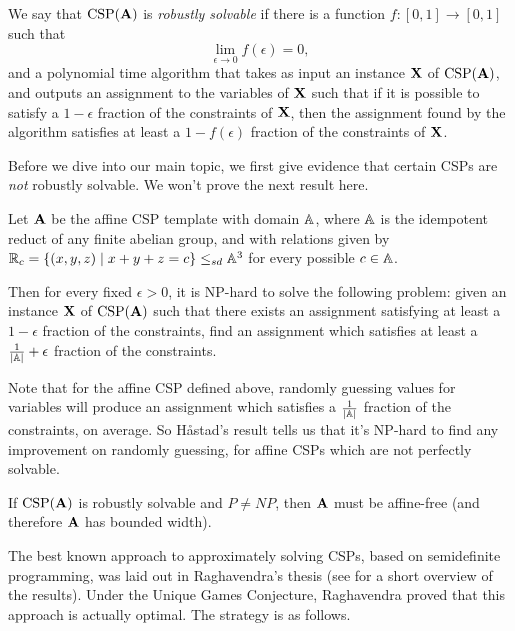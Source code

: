 \documentclass[letterpaper,11pt]{article}
\DeclareMathOperator{\CSP}{CSP}
\begin{document}
\begin{defn} We say that $\CSP(\fA)$ is \emph{robustly solvable} if there is a function $f : [0,1] \rightarrow [0,1]$ such that
\[
\lim_{\epsilon \rightarrow 0} f(\epsilon) = 0,
\]
and a polynomial time algorithm that takes as input an instance $\mathbf{X}$ of $\CSP(\fA)$, and outputs an assignment to the variables of $\mathbf{X}$ such that if it is possible to satisfy a $1-\epsilon$ fraction of the constraints of $\mathbf{X}$, then the assignment found by the algorithm satisfies at least a $1-f(\epsilon)$ fraction of the constraints of $\mathbf{X}$.
\end{defn}

Before we dive into our main topic, we first give evidence that certain CSPs are \emph{not} robustly solvable. We won't prove the next result here.

\begin{thm} Let $\mathbf{A}$ be the affine CSP template with domain $\mathbb{A}$, where $\mathbb{A}$ is the idempotent reduct of any finite abelian group, and with relations given by $\mathbb{R}_c = \{(x,y,z) \mid x+y+z = c\} \le_{sd} \mathbb{A}^3$ for every possible $c \in \mathbb{A}$.

Then for every fixed $\epsilon > 0$, it is NP-hard to solve the following problem: given an instance $\mathbf{X}$ of $\CSP(\fA)$ such that there exists an assignment satisfying at least a $1-\epsilon$ fraction of the constraints, find an assignment which satisfies at least a $\frac{1}{|\mathbb{A}|} + \epsilon$ fraction of the constraints.
\end{thm}

Note that for the affine CSP defined above, randomly guessing values for variables will produce an assignment which satisfies a $\frac{1}{|\mathbb{A}|}$ fraction of the constraints, on average. So H\r{a}stad's result tells us that it's NP-hard to find any improvement on randomly guessing, for affine CSPs which are not perfectly solvable.

\begin{cor} If $\CSP(\fA)$ is robustly solvable and $P \ne NP$, then $\mathbf{A}$ must be affine-free (and therefore $\mathbf{A}$ has bounded width).
\end{cor}

The best known approach to approximately solving CSPs, based on semidefinite programming, was laid out in Raghavendra's thesis \cite{raghavendra-thesis} (see \cite{raghavendra-optimal} for a short overview of the results). Under the Unique Games Conjecture, Raghavendra proved that this approach is actually optimal. The strategy is as follows.
\end{document}
